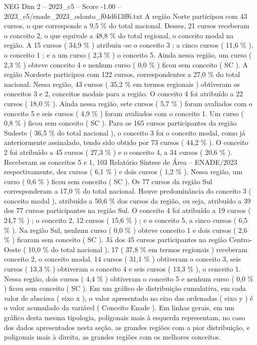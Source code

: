 \begin{textsample}{NEG Dim 2 – 2023\_c5 – Score -1.00 – 2023\_c5/enade\_2023\_odonto\_f04d613ff6.txt}
A região Norte participou com 43 cursos, o que corresponde a 9,5 \% do total nacional.
Desses, 21 cursos receberam o conceito 2, o que equivale a 48,8 \% do total regional, o conceito modal na região.
A 15 cursos ( 34,9 \% ) atribuiu -se o conceito 3 ; a cinco cursos ( 11,6 \% ), o conceito 1 ; e a um curso ( 2,3 \% ) o conceito 5.
Ainda nessa região, um curso ( 2,3 \% ) obteve conceito 4 e nenhum curso ( 0,0 \% ) ficou sem conceito ( SC ).
A região Nordeste participou com 122 cursos, correspondentes a 27,0 \% do total nacional.
Nessa região, 43 cursos ( 35,2 \% em termos regionais ) obtiveram os conceitos 3 e 2, conceitos modais para a região.
O conceito 4 foi atribuído a 22 cursos ( 18,0 \% ).
Ainda nessa região, sete cursos ( 5,7 \% ) foram avaliados com o conceito 5 e seis cursos ( 4,9 \% ) foram avaliados com o conceito 1.
Um curso ( 0,8 \% ) ficou sem conceito ( SC ).
Para os 165 cursos participantes da região Sudeste ( 36,5 \% do total nacional ), o conceito 3 foi o conceito modal, como já anteriormente assinalado, tendo sido obtido por 73 cursos ( 44,2 \% ).
O conceito 2 foi atribuído a 45 cursos ( 27,3 \% ) e o conceito 4, a 34 cursos ( 20,6 \% ).
Receberam os conceitos 5 e 1, 103 Relatório Síntese de Área – ENADE/2023 respectivamente, dez cursos ( 6,1 \% ) e dois cursos ( 1,2 \% ).
Nessa região, um curso ( 0,6 \% ) ficou sem conceito ( SC ).
Os 77 cursos da região Sul corresponderam a 17,0 \% do total nacional.
Houve predominância do conceito 3 ( conceito modal ), atribuído a 50,6 \% dos cursos da região, ou seja, atribuído a 39 dos 77 cursos participantes na região Sul.
O conceito 4 foi atribuído a 19 cursos ( 24,7 \% ) ; o conceito 2, 12 cursos ( 15,6 \% ) ; e o conceito 5, a cinco cursos ( 6,5 \% ).
Na região Sul, nenhum curso ( 0,0 \% ) obteve conceito 1 e dois cursos ( 2,6 \% ) ficaram sem conceito ( SC ).
Já dos 45 cursos participantes na região Centro-Oeste ( 10,0 \% do total nacional ), 17 ( 37,8 \% em termos regionais ) receberam conceito 2, o conceito modal. 14 cursos ( 31,1 \% ) obtiveram o conceito 3, seis cursos ( 13,3 \% ) obtiveram o conceito 4 e seis cursos ( 13,3 \% ), o conceito 1.
Nessa região, dois cursos ( 4,4 \% ) obtiveram o conceito 5 e nenhum curso ( 0,0 \% ) ficou sem conceito ( SC ).
Em um gráfico de distribuição cumulativa, em cada valor de abscissa ( eixo x ), o valor apresentado no eixo das ordenadas ( eixo y ) é o valor acumulado da variável ( Conceito Enade ).
Em linhas gerais, em um gráfico desta mesma tipologia, poligonais mais à esquerda representam, no caso dos dados apresentados nesta seção, as grandes regiões com a pior distribuição, e poligonais mais à direita, as grandes regiões com os melhores conceitos.

\end{textsample}
